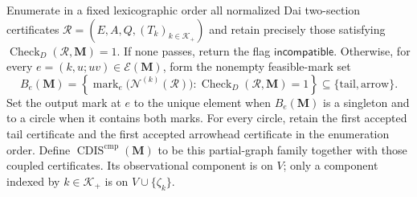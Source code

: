 Enumerate in a fixed lexicographic order all normalized Dai two-section certificates \(\mathcal R=(E,A,Q,(T_k)_{k\in\mathcal K_+})\) and retain precisely those satisfying \(\operatorname{Check}_{D}(\mathcal R,\mathbf M)=1\).  If none passes, return the flag \(\mathsf{incompatible}\).  Otherwise, for every \(e=(k,u;uv)\in\mathcal E(\mathbf M)\), form the nonempty feasible-mark set
\[
B_e(\mathbf M)=\left\{\operatorname{mark}_e\bigl(\mathcal N^{(k)}(\mathcal R)\bigr):\operatorname{Check}_{D}(\mathcal R,\mathbf M)=1\right\}\subseteq\{\mathrm{tail},\mathrm{arrow}\}.
\]
Set the output mark at \(e\) to the unique element when \(B_e(\mathbf M)\) is a singleton and to a circle when it contains both marks.  For every circle, retain the first accepted tail certificate and the first accepted arrowhead certificate in the enumeration order.  Define \(\operatorname{CDIS}^{\mathrm{cmp}}(\mathbf M)\) to be this partial-graph family together with those coupled certificates.  Its observational component is on \(V\); only a component indexed by \(k\in\mathcal K_+\) is on \(V\cup\{\zeta_k\}\).